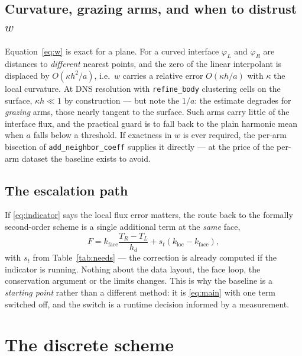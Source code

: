 \documentclass[11pt,a4paper]{article}
\newcommand{\code}[1]{\texttt{#1}}
\begin{document}
\subsection{Curvature, grazing arms, and when to distrust \texorpdfstring{$w$}{w}}
\label{sec:wcaveats}

Equation~\eqref{eq:w} is exact for a plane. For a curved interface $\varphi_L$
and $\varphi_R$ are distances to \emph{different} nearest points, and the zero
of the linear interpolant is displaced by $O(\kappa h^2/a)$, i.e.\ $w$ carries a
relative error $O(\kappa h/a)$ with $\kappa$ the local curvature. At DNS
resolution with \code{refine\_body} clustering cells on the surface,
$\kappa h\ll1$ by construction --- but note the $1/a$: the estimate degrades for
\emph{grazing} arms, those nearly tangent to the surface. Such arms carry little
of the interface flux, and the practical guard is to fall back to the plain
harmonic mean when $a$ falls below a threshold. If exactness in $w$ is ever
required, the per-arm bisection of \code{add\_neighbor\_coeff} supplies it
directly --- at the price of the per-arm dataset the baseline exists to avoid.

\subsection{The escalation path}
\label{sec:escalation}

If \eqref{eq:indicator} says the local flux error matters, the route back to the
formally second-order scheme is a single additional term at the \emph{same}
face,
\begin{equation}
  F = k_{\text{face}}\frac{T_R-T_L}{h_d}
      + s_t\left(k_{\text{loc}}-k_{\text{face}}\right),
\end{equation}
with $s_t$ from Table~\ref{tab:needs} --- the correction is already computed if
the indicator is running. Nothing about the data layout, the face loop, the
conservation argument or the limits changes. This is why the baseline is a
\emph{starting point} rather than a different method: it is \eqref{eq:main} with
one term switched off, and the switch is a runtime decision informed by a
measurement.

\section{The discrete scheme}
\end{document}

